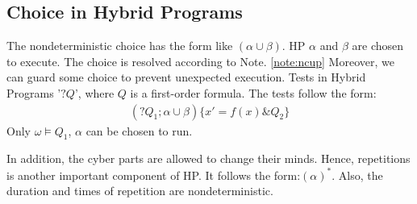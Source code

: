\subsection{Choice in Hybrid Programs}

The nondeterministic choice has the form like $(\alpha \cup \beta)$. 
HP $\alpha$ and $\beta$ are chosen to execute.
The choice is resolved according to Note. \ref{note:ncup}
Moreover, we can guard some choice to prevent unexpected execution.
Tests in Hybrid Programs '$?Q$', where $Q$ is a first-order formula.
The tests follow the form: 
\begin{align*}
  (?Q_1;\alpha \cup \beta)\{x'=f(x) \& Q_2\}
\end{align*}
Only $\omega \vDash Q_1$, $\alpha$ can be chosen to run.

In addition, the cyber parts are allowed to change their minds.
Hence, repetitions is another important component of HP.
It follows the form:$(\alpha)^*$.
Also, the duration and times of repetition are nondeterministic.